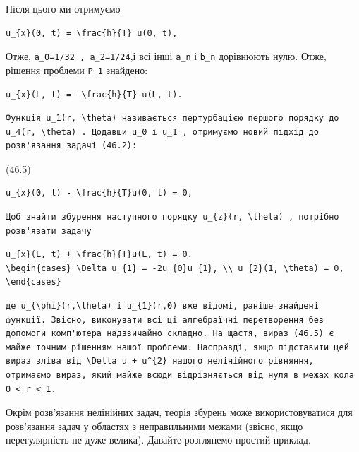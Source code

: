 \documentclass[
  ukrainian,
]{article}
\begin{document}
Після цього ми отримуємо

\begin{verbatim}
u_{x}(0, t) = \frac{h}{T} u(0, t),
\end{verbatim}

Отже, \texttt{a\_0=1/32\ ,\ a\_2=1/24},і всі інші \texttt{a\_n} і
\texttt{b\_n} дорівнюють нулю. Отже, рішення проблеми \texttt{P\_1}
знайдено:

\begin{verbatim}
u_{x}(L, t) = -\frac{h}{T} u(L, t).
\end{verbatim}

\begin{verbatim}
Функція u_1(r, \theta) називається пертурбацією першого порядку до u_4(r, \theta) . Додавши u_0 і u_1 , отримуємо новий підхід до розв'язання задачі (46.2):
\end{verbatim}

(46.5)

\begin{verbatim}
u_{x}(0, t) - \frac{h}{T}u(0, t) = 0,
\end{verbatim}

\begin{verbatim}
Щоб знайти збурення наступного порядку u_{z}(r, \theta) , потрібно розв'язати задачу
\end{verbatim}

\begin{verbatim}
u_{x}(L, t) + \frac{h}{T}u(L, t) = 0.
\begin{cases} \Delta u_{1} = -2u_{0}u_{1}, \\ u_{2}(1, \theta) = 0, \end{cases}
\end{verbatim}

\begin{verbatim}
де u_{\phi}(r,\theta) і u_{1}(r,0) вже відомі, раніше знайдені функції. Звісно, виконувати всі ці алгебраїчні перетворення без допомоги комп'ютера надзвичайно складно. На щастя, вираз (46.5) є майже точним рішенням нашої проблеми. Насправді, якщо підставити цей вираз зліва від \Delta u + u^{2} нашого нелінійного рівняння, отримаємо вираз, який майже всюди відрізняється від нуля в межах кола 0 < r < 1.
\end{verbatim}

Окрім розв'язання нелінійних задач, теорія збурень може
використовуватися для розв'язання задач у областях з неправильними
межами (звісно, якщо нерегулярність не дуже велика). Давайте розглянемо
простий приклад.
\end{document}
